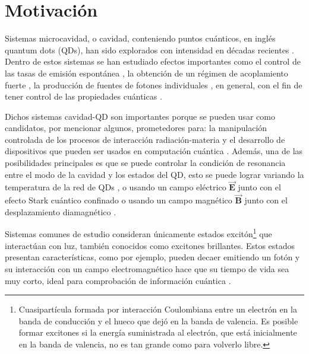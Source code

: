 \documentclass[main.tex]{subfiles}
\begin{document}
\chapter{Motivación}
Sistemas microcavidad, o cavidad, conteniendo puntos cuánticos, en inglés quantum dots (QDs), han sido explorados con intensidad en décadas recientes \parencite{Reitzenstein2012}. Dentro de estos sistemas se han estudiado efectos importantes como el control de las tasas de emisión espontánea \parencite{Bayer2001}, la obtención de un régimen de acoplamiento fuerte \parencite{Reithmaier2004}, la producción de fuentes de fotones individuales \parencite{Michler2000}, en general, con el fin de tener control de las propiedades cuánticas \parencite{Jimenez2017}.

Dichos sistemas cavidad-QD son importantes porque se pueden usar como candidatos, por mencionar algunos, prometedores para: la manipulación controlada de los procesos de interacción radiación-materia y el desarrollo de dispositivos que pueden ser usados en computación cuántica \parencite{Jimenez2017}. Además, una de las posibilidades principales es que se puede controlar la condición de resonancia entre el modo de la cavidad y los estados del QD, esto se puede lograr variando la temperatura de la red de QDs \parencite{Reithmaier2004}, o usando un campo eléctrico  $\vec{\mathbf{E}}$ junto con el efecto Stark cuántico confinado o usando  un campo magnético $\vec{\mathbf{B}}$ junto con el desplazamiento diamagnético \parencite{Jimenez2017}.

Sistemas comunes de estudio consideran únicamente estados excitón\footnote{Cuasipartícula formada por interacción Coulombiana entre un electrón en la banda de conducción y el hueco que dejó en la banda de valencia. Es posible formar excitones si la energía suministrada al electrón, que está inicialmente en la banda de valencia, no es tan grande como para volverlo libre.} que interactúan con luz, también conocidos como excitones brillantes. Estos estados presentan características, como por ejemplo, pueden decaer emitiendo un fotón y su interacción con un campo electromagnético hace que su tiempo de vida sea muy corto, ideal para comprobación de información cuántica \parencite{Poem2010}. 
\end{document}

